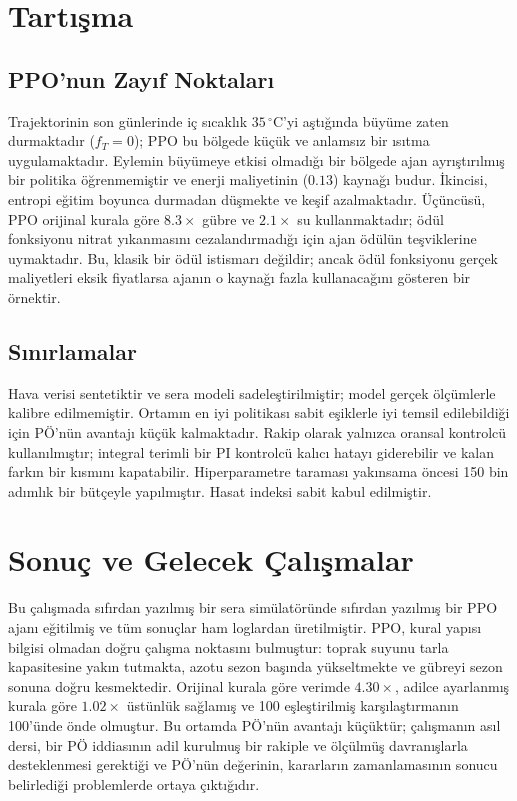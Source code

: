 \documentclass[conference,a4paper]{IEEEtran}
\begin{document}
\section{Tartışma}
\label{sec:tartisma}

\subsection{PPO'nun Zayıf Noktaları}
Trajektorinin son günlerinde iç sıcaklık $35\,^{\circ}$C'yi aştığında büyüme zaten durmaktadır ($f_T=0$); PPO bu bölgede küçük ve anlamsız bir ısıtma uygulamaktadır. Eylemin büyümeye etkisi olmadığı bir bölgede ajan ayrıştırılmış bir politika öğrenmemiştir ve enerji maliyetinin ($0.13$) kaynağı budur. İkincisi, entropi eğitim boyunca durmadan düşmekte ve keşif azalmaktadır. Üçüncüsü, PPO orijinal kurala göre $8.3\times$ gübre ve $2.1\times$ su kullanmaktadır; ödül fonksiyonu nitrat yıkanmasını cezalandırmadığı için ajan ödülün teşviklerine uymaktadır. Bu, klasik bir ödül istismarı değildir; ancak ödül fonksiyonu gerçek maliyetleri eksik fiyatlarsa ajanın o kaynağı fazla kullanacağını gösteren bir örnektir.

\subsection{Sınırlamalar}
Hava verisi sentetiktir ve sera modeli sadeleştirilmiştir; model gerçek ölçümlerle kalibre edilmemiştir. Ortamın en iyi politikası sabit eşiklerle iyi temsil edilebildiği için PÖ'nün avantajı küçük kalmaktadır. Rakip olarak yalnızca oransal kontrolcü kullanılmıştır; integral terimli bir PI kontrolcü kalıcı hatayı giderebilir ve kalan farkın bir kısmını kapatabilir. Hiperparametre taraması yakınsama öncesi 150 bin adımlık bir bütçeyle yapılmıştır. Hasat indeksi sabit kabul edilmiştir.

\section{Sonuç ve Gelecek Çalışmalar}
Bu çalışmada sıfırdan yazılmış bir sera simülatöründe sıfırdan yazılmış bir PPO ajanı eğitilmiş ve tüm sonuçlar ham loglardan üretilmiştir. PPO, kural yapısı bilgisi olmadan doğru çalışma noktasını bulmuştur: toprak suyunu tarla kapasitesine yakın tutmakta, azotu sezon başında yükseltmekte ve gübreyi sezon sonuna doğru kesmektedir. Orijinal kurala göre verimde $4.30\times$, adilce ayarlanmış kurala göre $1.02\times$ üstünlük sağlamış ve 100 eşleştirilmiş karşılaştırmanın 100'ünde önde olmuştur. Bu ortamda PÖ'nün avantajı küçüktür; çalışmanın asıl dersi, bir PÖ iddiasının adil kurulmuş bir rakiple ve ölçülmüş davranışlarla desteklenmesi gerektiği ve PÖ'nün değerinin, kararların zamanlamasının sonucu belirlediği problemlerde ortaya çıktığıdır.
\end{document}
